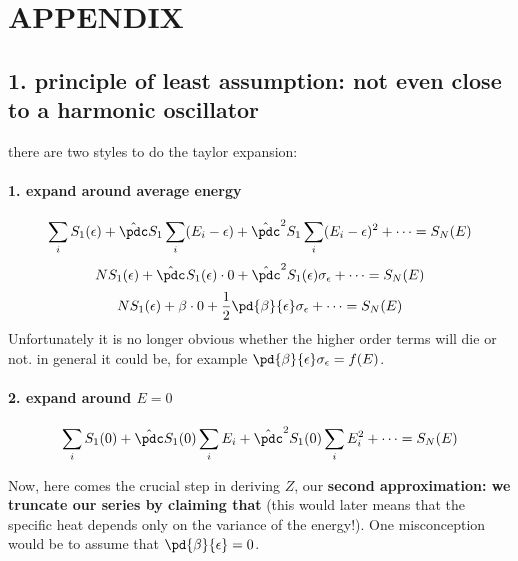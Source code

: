 \section{APPENDIX}
        \subsection{1. principle of least assumption: not even close to a harmonic oscillator}
        there are two styles to do the taylor expansion:
        
        \paragraph{1. expand around average energy \aE}
        \[ \soi S_1(\aE) +  \hat\pdc S_1 \soi(E_i-\aE) +  {\hat\pdc}^2 S_1 \soi (E_i-\aE)^2 + \cdots  = S_N(E) \]
        \[ NS_1(\aE) + \Stothei{} \cdot 0 + \Stothei{2}\sigma_\aE + \cdots = S_N(E)   \]
        \[ NS_1(\aE) + \beta \cdot 0 + \frac12\pd{\beta}{\aE}\sigma_\aE + \cdots = S_N(E)   \]
        Unfortunately it is no longer obvious whether the higher order terms will die or not. in general it could be, for example $ \pd{\beta}{\aE}\sigma_\aE = f(E)$.

        \paragraph{2. expand around $E=0$}
        \[ \soi S_1(0) +  \hat\pdc S_1(0) \soi E_i +  {\hat\pdc}^2 S_1(0) \soi E_i^2 + \cdots  = S_N(E) \]

         Now, here comes the crucial step in deriving $Z$, our {\bf second approximation: we truncate our series by claiming that  }(this would later means that the specific heat depends only on the variance of the energy!). One misconception would be to assume that $\pd{\beta}{\aE}=0$.


